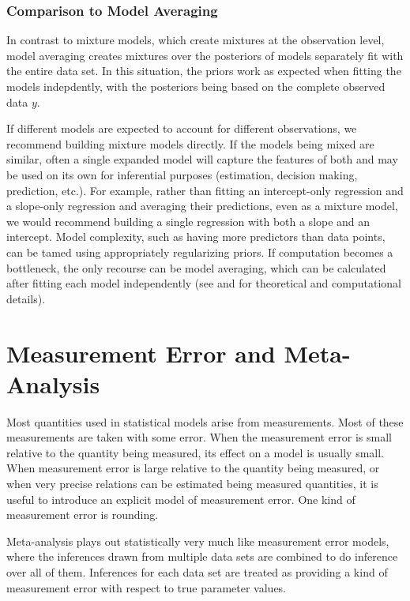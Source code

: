 \subsection{Comparison to Model Averaging}

In contrast to mixture models, which create mixtures at the
observation level, model averaging creates mixtures over the
posteriors of models separately fit with the entire data set.  In this
situation, the priors work as expected when fitting the models
indepdently, with the posteriors being based on the complete observed
data $y$.

If different models are expected to account for different
observations, we recommend building mixture models directly.  If the
models being mixed are similar, often a single expanded model will
capture the features of both and may be used on its own for
inferential purposes (estimation, decision making, prediction, etc.).
For example, rather than fitting an intercept-only regression and a
slope-only regression and averaging their predictions, even as a
mixture model, we would recommend building a single regression with
both a slope and an intercept.  Model complexity, such as having more
predictors than data points, can be tamed using appropriately
regularizing priors.  If computation becomes a bottleneck, the only
recourse can be model averaging, which can be calculated after fitting
each model independently (see \citep{HoetingEtAl:1999} and
\citep{GelmanEtAl:2013} for theoretical and computational details).


\chapter{Measurement Error and Meta-Analysis}

\noindent
Most quantities used in statistical models arise from measurements.
Most of these measurements are taken with some error.  When the
measurement error is small relative to the quantity being measured,
its effect on a model is usually small.  When measurement error is
large relative to the quantity being measured, or when very precise
relations can be estimated being measured quantities, it is useful to
introduce an explicit model of measurement error.  One kind of
measurement error is rounding. 

Meta-analysis plays out statistically very much like measurement error
models, where the inferences drawn from multiple data sets are
combined to do inference over all of them.  Inferences for each data
set are treated as providing a kind of measurement error with respect
to true parameter values.


